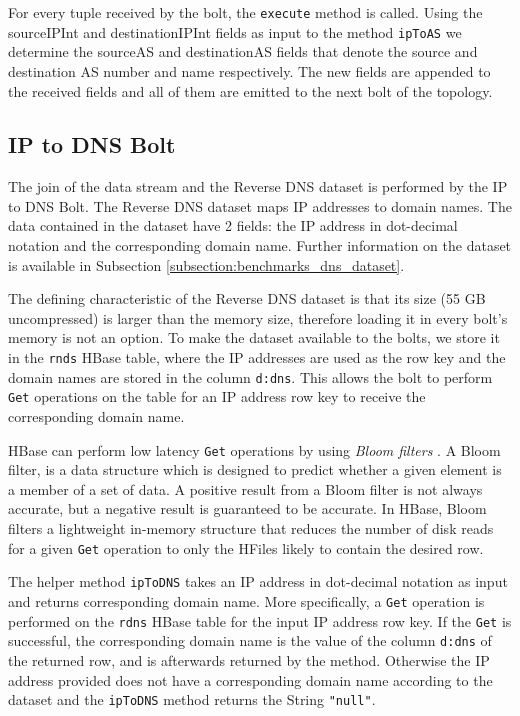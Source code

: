 For every tuple received by the bolt, the \texttt{execute} method is called. Using the sourceIPInt and destinationIPInt fields as input to the method \texttt{ipToAS} we determine the sourceAS and destinationAS fields that denote the source and destination AS number and name respectively. The new fields are appended to the received fields and all of them are emitted to the next bolt of the topology.

\bigskip

\subsection{IP to DNS Bolt}

The join of the data stream and the Reverse DNS dataset is performed by the IP to DNS Bolt. The Reverse DNS dataset maps IP addresses to domain names. The data contained in the dataset have 2 fields: the IP address in dot-decimal notation and the corresponding domain name. Further information on the dataset is available in Subsection \ref{subsection:benchmarks_dns_dataset}.

The defining characteristic of the Reverse DNS dataset is that its size (55 GB uncompressed) is larger than the memory size, therefore loading it in every bolt's memory is not an option. To make the dataset available to the bolts, we store it in the \texttt{rnds} HBase table, where the IP addresses are used as the row key and the domain names are stored in the column \texttt{d:dns}. This allows the bolt to perform \texttt{Get} operations on the table for an IP address row key to receive the corresponding domain name.

HBase can perform low latency \texttt{Get} operations by using \emph{Bloom filters} \cite{bloom}. A Bloom filter, is a data structure which is designed to predict whether a given element is a member of a set of data. A positive result from a Bloom filter is not always accurate, but a negative result is guaranteed to be accurate. In HBase, Bloom filters a lightweight in-memory structure that reduces the number of disk reads for a given \texttt{Get} operation to only the HFiles likely to contain the desired row.

The helper method \texttt{ipToDNS} takes an IP address in dot-decimal notation as input and returns corresponding domain name. More specifically, a \texttt{Get} operation is performed on the \texttt{rdns} HBase table for the input IP address row key. If the \texttt{Get} is successful, the corresponding domain name is the value of the column \texttt{d:dns} of the returned row, and is afterwards returned by the method. Otherwise the IP address provided does not have a corresponding domain name according to the dataset and the \texttt{ipToDNS} method returns the String \texttt{"null"}.

